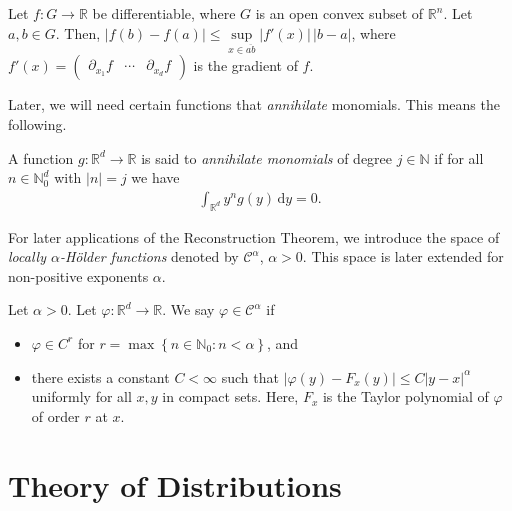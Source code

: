\begin{theorem}\label{mean-value-inequality}
    Let \(f: G \to \mathbb{R}\) be differentiable, where \(G\) is an open convex subset of \(\mathbb{R}^n\). Let \(a,b \in G\). Then, \(|f(b) - f(a)| \leq \sup\limits_{x \in \overline{ab}} |f'(x)| \, |b-a|\), where 
    \(
        f'(x) = 
        \begin{pmatrix}
            \partial_{x_1}f & \cdots & \partial_{x_d}f
        \end{pmatrix}
    \)
    is the gradient of \(f\). 
\end{theorem}

Later, we will need certain functions that \emph{annihilate} monomials. This means the following.

\begin{definition}
    A function \(g: \mathbb{R}^d \to \mathbb{R}\) is said to \emph{annihilate monomials} of degree \(j \in \mathbb{N}\) if for all \(n \in \mathbb{N}^d_0\) with \(|n| = j\) we have
    \begin{align*}
        \int_{\mathbb{R}^d} y^n g (y) \, \mathrm{d}y = 0.
    \end{align*}
\end{definition}

For later applications of the Reconstruction Theorem, we introduce the space of \emph{locally \({\alpha}\)-Hölder functions} denoted by \(\mathcal{C}^{\alpha}\), \(\alpha > 0\). This space is later extended for non-positive exponents \({\alpha}\). 

\begin{definition}\label{definition:hoelder-functions}
    Let \(\alpha > 0\). Let \(\varphi: \mathbb{R}^d \to \mathbb{R}\). We say \(\varphi \in \mathcal{C}^{\alpha}\) if
\begin{itemize}
    \item \(\varphi \in C^r\) for \(r = \max \left \{ n \in \mathbb{N}_0 : n < \alpha \right \} \), and
    \item there exists a constant \(C < {\infty}\) such that \(|\varphi(y) - F_x(y)| \leq C |y-x|^{\alpha}\) uniformly for all \(x,y\) in compact sets. Here, \(F_x\) is the Taylor polynomial of \({\varphi}\) of order \(r\) at \(x\).   
\end{itemize}
\end{definition}


\section{Theory of Distributions}\label{chapter:distributions}

